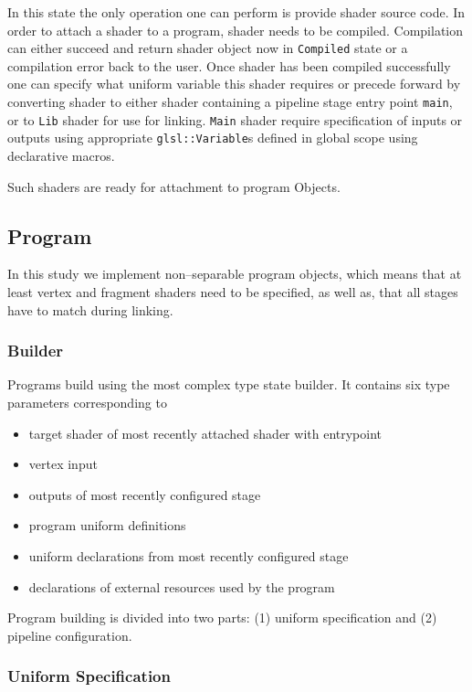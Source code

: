In this state the only operation one can perform is provide shader source code. In order to attach a shader to a program, shader needs to be compiled. 
Compilation can either succeed and return shader object now in \texttt{Compiled} state or a compilation error back to the user.
Once shader has been compiled successfully one can specify what uniform variable this shader requires or precede forward by converting shader 
to either shader containing a pipeline stage entry point \texttt{main}, or to \texttt{Lib} shader for use for linking.
\texttt{Main} shader require specification of inputs or outputs using appropriate \texttt{glsl::Variable}s defined in global scope using declarative macros.

Such shaders are ready for attachment to program Objects.

\subsection{Program}

In this study we implement non--separable program objects, which means that at least vertex and fragment shaders need to be specified, as well as, that all stages have to match during linking.

\subsubsection{Builder}

Programs build using the most complex type state builder. It contains six type parameters corresponding to
\begin{itemize}
    \item target shader of most recently attached shader with entrypoint
    \item vertex input
    \item outputs of most recently configured stage
    \item program uniform definitions
    \item uniform declarations from most recently configured stage
    \item declarations of external resources used by the program
\end{itemize}

Program building is divided into two parts: (1) uniform specification and (2) pipeline configuration.


\subsubsection{Uniform Specification}

